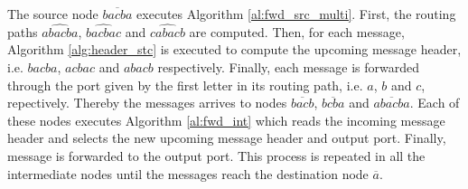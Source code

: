 The source node $\overline{bacba}$ executes Algorithm \ref{al:fwd_src_multi}. First, the routing paths $\widehat{abacba}$, $\widehat{bacbac}$ and $\widehat{cabacb}$ are computed. Then, for each message, Algorithm \ref{alg:header_stc} is executed to compute the upcoming message header, i.e. $bacba$, $acbac$ and $abacb$ respectively. Finally, each message is forwarded through the port given by the first letter in its routing path, i.e. $a$, $b$ and $c$, repectively. 
Thereby the messages arrives to nodes $\overline{bacb}$, $\overline{bcba}$ and $\overline{abacba}$. Each of these nodes executes Algorithm \ref{al:fwd_int} which reads the incoming message header and selects the new upcoming message header and output port. Finally, message is forwarded to the output port. This process is repeated in all the intermediate nodes until the messages reach the destination node $\overline{a}$.
